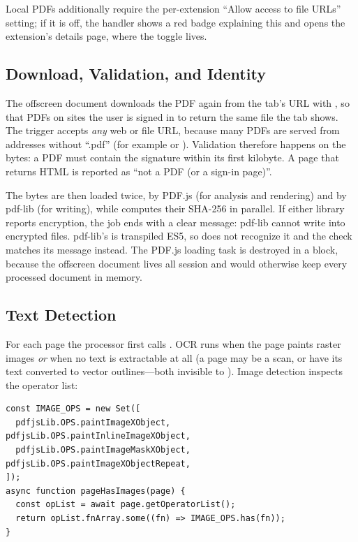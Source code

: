 Local  PDFs additionally require the per-extension ``Allow access to
file URLs'' setting; if it is off, the handler shows a red badge explaining this
and opens the extension's details page, where the toggle lives.

\subsection{Download, Validation, and Identity}
The offscreen document downloads the PDF again from the tab's URL with
, so that PDFs on sites the user is signed in to
return the same file the tab shows. The trigger accepts \emph{any} web or file
URL, because many PDFs are served from addresses without ``.pdf'' (for example
 or ). Validation therefore
happens on the bytes: a PDF must contain the signature  within its
first kilobyte. A page that returns HTML is reported as ``not a PDF (or a
sign-in page)''.

The bytes are then loaded twice, by PDF.js (for analysis and rendering) and by
pdf-lib (for writing), while  computes their SHA-256 in
parallel. If either library reports encryption, the job ends with a clear
message: pdf-lib cannot write into encrypted files. pdf-lib's
 is transpiled ES5, so  does not
recognize it and the check matches its message instead. The PDF.js loading task
is destroyed in a  block, because the offscreen document lives all
session and would otherwise keep every processed document in memory.

\subsection{Text Detection}
For each page the processor first calls . OCR runs when
the page paints raster images \emph{or} when no text is extractable at all (a page
may be a scan, or have its text converted to vector outlines---both invisible to
). Image detection inspects the operator list:

\begin{lstlisting}[caption={Image detection: scans the PDF.js operator list for raster paint opcodes to decide whether a page needs OCR (\code{processor.js}).}, label={lst:hasimages}]
const IMAGE_OPS = new Set([
  pdfjsLib.OPS.paintImageXObject,      pdfjsLib.OPS.paintInlineImageXObject,
  pdfjsLib.OPS.paintImageMaskXObject,  pdfjsLib.OPS.paintImageXObjectRepeat,
]);
async function pageHasImages(page) {
  const opList = await page.getOperatorList();
  return opList.fnArray.some((fn) => IMAGE_OPS.has(fn));
}
\end{lstlisting}

